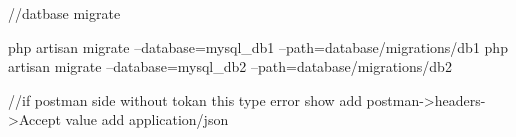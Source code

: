 //datbase migrate

php artisan migrate --database=mysql_db1 --path=database/migrations/db1
php artisan migrate --database=mysql_db2 --path=database/migrations/db2



//if postman side without tokan  this type error show
add postman->headers->Accept value add  application/json



